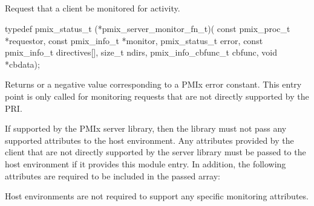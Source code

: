 \subsection{}

\summary

Request that a client be monitored for activity.

\format

\cspecificstart
\begin{codepar}
typedef pmix_status_t (*pmix_server_monitor_fn_t)(
                             const pmix_proc_t *requestor,
                             const pmix_info_t *monitor, pmix_status_t error,
                             const pmix_info_t directives[], size_t ndirs,
                             pmix_info_cbfunc_t cbfunc, void *cbdata);
\end{codepar}
\cspecificend

\begin{arglist}
\end{arglist}

Returns  or a negative value corresponding to a PMIx error constant. This entry point is only called for monitoring requests that are not directly supported by the \ac{PRI}.

\reqattrstart
If supported by the \ac{PMIx} server library, then the library must not pass any supported attributes to the host environment. Any attributes provided by the client that are not directly supported by the server library must be passed to the host environment if it provides this module entry. In addition, the following attributes are required to be included in the passed  array:


Host environments are not required to support any specific monitoring attributes.

